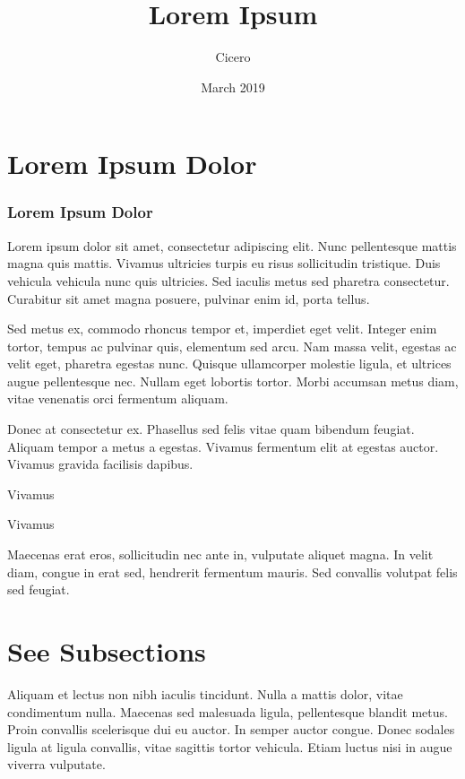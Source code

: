 \documentclass{beamer}
\title{Lorem Ipsum}
\author{Cicero}
\date{March 2019}
\begin{document}
\frame{\titlepage}


\section{Lorem Ipsum Dolor}
\begin{frame}
    \frametitle{Lorem Ipsum Dolor}
    Lorem ipsum dolor sit amet, consectetur adipiscing elit. 
    Nunc pellentesque mattis magna quis mattis. 
    Vivamus ultricies turpis eu risus sollicitudin tristique. 
    Duis vehicula vehicula nunc quis ultricies. 
    Sed iaculis metus sed pharetra consectetur. 
    Curabitur sit amet magna posuere, pulvinar enim id, porta tellus. 


    Sed metus ex, commodo rhoncus tempor et, imperdiet eget velit. 
    Integer enim tortor, tempus ac pulvinar quis, elementum sed arcu. 
    Nam massa velit, egestas ac velit eget, pharetra egestas nunc. 
    Quisque ullamcorper molestie ligula, et ultrices augue pellentesque nec. 
    Nullam eget lobortis tortor. 
    Morbi accumsan metus diam, vitae venenatis orci fermentum aliquam.
\end{frame}


{
\begin{frame}
    Donec at consectetur ex. 
    Phasellus sed felis vitae quam bibendum feugiat. 
    Aliquam tempor a metus a egestas. 
    Vivamus fermentum elit at egestas auctor. 
    Vivamus gravida facilisis dapibus.  \pause


    Vivamus \pause
    

    Vivamus \pause
    
 
    Maecenas erat eros, sollicitudin nec ante in, vulputate aliquet magna. 
    In velit diam, congue in erat sed, hendrerit fermentum mauris. 
    Sed convallis volutpat felis sed feugiat.
\end{frame}
}

\section{See Subsections}
\begin{frame}
    Aliquam et lectus non nibh iaculis tincidunt. 
    Nulla a mattis dolor, vitae condimentum nulla. 
    Maecenas sed malesuada ligula, pellentesque blandit metus. 
    Proin convallis scelerisque dui eu auctor. 
    In semper auctor congue. 
    Donec sodales ligula at ligula convallis, vitae sagittis tortor vehicula. 
    Etiam luctus nisi in augue viverra vulputate. 
\end{frame}
\end{document}
